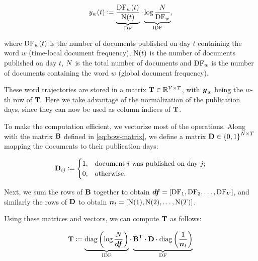 \begin{equation}
	y_{w}(t) \coloneqq \underbrace{\frac{\text{DF}_{w}(t)}{\text{N}(t)}}_{\text{DF}} \cdot \underbrace{\log{\frac{N}{\text{DF}_{w}}}}_{\text{IDF}},
\end{equation}

where $\text{DF}_{w}(t)$ is the number of documents published on day $t$ containing the word $w$ (time-local document frequency), $\text{N}(t)$ is the number of documents published on day $t$, $N$ is the total number of documents and $\text{DF}_{w}$ is the number of documents containing the word $w$ (global document frequency).

These word trajectories are stored in a matrix $\mathbf{T} \in \mathbb{R}^{V \times T}$, with $\vect{\traj}_w$ being the $w$-th row of $\mathbf{T}$. Here we take advantage of the normalization of the publication days, since they can now be used as column indices of $\mathbf{T}$.

To make the computation efficient, we vectorize most of the operations. Along with the matrix $\mathbf{B}$ defined in \ref{eq:bow-matrix}, we define a matrix $\mathbf{D} \in \left\{ 0, 1 \right\}^{N \times T}$ mapping the documents to their publication days:

\begin{equation}
	\mathbf{D}_{ij} \coloneqq
	\begin{cases}
		1, & \text{document}~i~\text{was published on day}~j \text{;} \\
		0, & \text{otherwise}.
	\end{cases}
\end{equation}

Next, we sum the rows of $\mathbf{B}$ together to obtain $\vect{\df} = \left[ \text{\df}_{1}, \text{\df}_{2}, \dots, \text{\df}_{\featcount} \right]$, and similarly the rows of $\mathbf{D}$ to obtain $\vect{\doccount}_{t} = \left[ \text{\doccount}(1), \text{\doccount}(2), \dots, \text{\doccount}(\streamlen) \right]$.

Using these matrices and vectors, we can compute $\mathbf{T}$ as follows:

\begin{equation}
	\trajmat \coloneqq
		\underbrace{\text{diag} \left( \log{\frac{\doccount}{\vect{\df}}} \right)}_{\text{IDF}}
		\cdot
		\underbrace{\bowmat^{\T}
		\cdot \dtdmat
		\cdot \text{diag} \left( \frac{1}{\vect{\doccount}_{t}} \right)}_{\text{DF}}
\end{equation}

